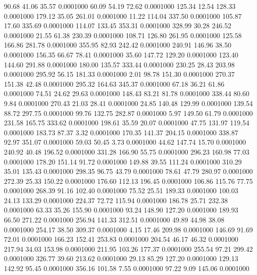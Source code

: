   90.68   41.06   35.57   0.0001000
  60.09   54.19   72.62   0.0001000
 125.34   12.54  128.33   0.0001000
 179.12   35.05  261.01   0.0001000
  11.22  114.04  337.50   0.0001000
 105.87   17.60  335.69   0.0001000
 114.07  133.45  353.31   0.0001000
 328.99   30.28  246.52   0.0001000
  21.55   61.38  230.39   0.0001000
 108.71  126.80  261.95   0.0001000
 125.58  166.86  281.78   0.0001000
 355.95   82.93  242.42   0.0001000
 240.91  146.96   38.50   0.0001000
 156.35   66.67   78.41   0.0001000
  35.60  147.72  129.20   0.0001000
 123.40  144.60  291.88   0.0001000
 180.00  135.57  333.44   0.0001000
 230.25   28.43  203.98   0.0001000
 295.92   56.15  181.33   0.0001000
   2.01   98.78  151.30   0.0001000
 270.37  151.38   42.48   0.0001000
 295.32  164.63  345.37   0.0001000
  67.18   36.21   61.86   0.0001000
  74.51   24.62   29.63   0.0001000
 148.43   83.21   81.78   0.0001000
 338.44   80.60    9.84   0.0001000
 270.43   21.03   28.41   0.0001000
  24.85  140.48  129.99   0.0001000
 139.54   88.72  297.75   0.0001000
  99.76  132.75  282.87   0.0001000
   5.97  149.50   61.79   0.0001000
 231.58  165.75  333.62   0.0001000
 198.61   35.59   20.07   0.0001000
  47.75  131.97  119.54   0.0001000
 183.73   87.37    3.32   0.0001000
 170.35  141.37  204.15   0.0001000
 338.87   92.97  351.07   0.0001000
  59.03   50.45    3.73   0.0001000
  44.62  147.74   15.70   0.0001000
 240.92   40.48  196.52   0.0001000
 331.28  166.90   55.75   0.0001000
 296.23  160.98   77.03   0.0001000
 178.20  151.14   91.72   0.0001000
 149.88   39.55  111.24   0.0001000
 310.29   35.01  135.43   0.0001000
 298.35   96.75   43.79   0.0001000
  78.61   47.79  280.97   0.0001000
 272.39   25.33  150.22   0.0001000
 176.60  112.13  196.45   0.0001000
 106.86  115.76   77.75   0.0001000
 268.39   91.16  102.40   0.0001000
  75.52   25.51  189.33   0.0001000
 100.03   24.13  133.29   0.0001000
 224.37   72.72  115.94   0.0001000
 186.78   25.71  232.38   0.0001000
  63.33   35.26  155.90   0.0001000
  93.24  148.90  127.20   0.0001000
 189.93   66.50  271.22   0.0001000
 256.94  141.33  312.51   0.0001000
  49.89   44.98   38.08   0.0001000
 254.17   38.50  309.37   0.0001000
   4.15   17.46  209.98   0.0001000
 146.69   91.69   72.01   0.0001000
 166.23  152.41  253.83   0.0001000
 204.54   46.17   46.32   0.0001000
 217.94   34.03  153.98   0.0001000
 211.95  103.26  177.37   0.0001000
 255.54   97.21  299.42   0.0001000
 326.77   39.60  213.62   0.0001000
  29.13   85.29  127.20   0.0001000
 129.13  142.92   95.45   0.0001000
 356.16  101.58    7.55   0.0001000
  97.22    9.09  145.06   0.0001000
